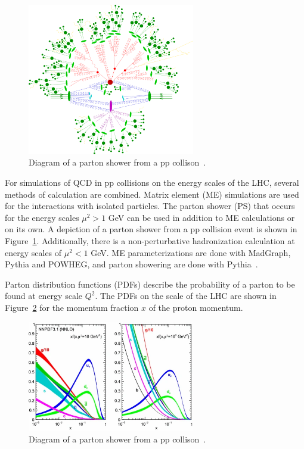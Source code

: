 \begin{figure}[h]
	\centering
	\includegraphics[width=0.65\textwidth]{figures/parton_shower.png}
	\caption{Diagram of a parton shower from a pp collison~\cite{PartonShower}.}
	\label{fig:ps}
\end{figure}

For simulations of QCD in pp collisions on the energy scales of the LHC, several methods of calculation are combined. Matrix element (ME) simulations are used for the interactions with isolated particles. The parton shower (PS) that occurs for the energy scales $\mu^2 > 1$ GeV can be used in addition to ME calculations or on its own. A depiction of a parton shower from a pp collision event is shown in Figure~\ref{fig:ps}. Additionally, there is a non-perturbative hadronization calculation at energy scales of $\mu^2 < 1$ GeV. ME parameterizations are done with MadGraph, Pythia and POWHEG, and parton showering are done with Pythia~\cite{MadGraph,pythia8}.

Parton distribution functions (PDFs) describe the probability of a parton to be found at energy scale $Q^2$. The PDFs on the scale of the LHC are shown in Figure~\ref{fig:pdf} for the momentum fraction $x$ of the proton momentum.

\begin{figure}[h]
	\centering
	\includegraphics[width=0.65\textwidth]{figures/pdf_lhc.png}
	\caption{Diagram of a parton shower from a pp collison~\cite{pdfs}.}
	\label{fig:pdf}
\end{figure}



